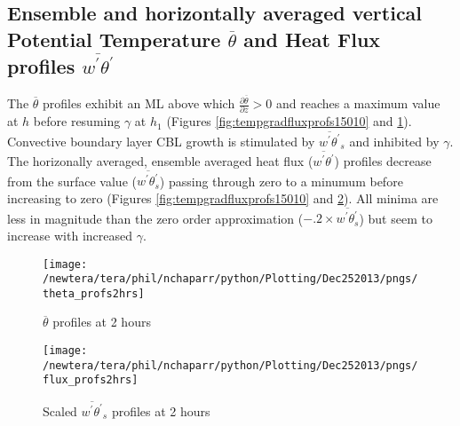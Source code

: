 \clearpage

\subsection{Ensemble and horizontally averaged vertical Potential Temperature $\overline{\theta}$ 
and Heat Flux profiles $\overline{w^{'}\theta^{'}}$}
\FloatBarrier

\clearpage

The $\overline{\theta}$ profiles exhibit an \acs{ML} above which  $\frac{\partial\overline{\theta}}{\partial z}>0$ 
and reaches a maximum value at $h$ before resuming $\gamma$  at $h_{1}$ 
(Figures \ref{fig:tempgradfluxprofs15010} and \ref{fig:pottempprofs2hrs}).  Convective boundary layer \acs{CBL} growth is stimulated 
by $\overline{w^{'}\theta^{'}}_{s}$ and inhibited by $\gamma$.\\

The horizonally averaged, ensemble averaged heat flux ($\overline{w^{'}\theta^{'}}$) profiles decrease 
from the surface value ($\overline{w^{'}\theta^{'}_{s}}$) passing through zero to a minumum before 
increasing to zero (Figures \ref{fig:tempgradfluxprofs15010} and  \ref{fig:fluxprofs2hrs}).  All minima are 
less  in magnitude than the zero order approximation ($-.2 \times \overline{w^{'}\theta^{'}_{s}}$) but seem to increase
with increased $\gamma$.\\


\begin{figure}[htbp]
    \centering
    \texttt{[image: /newtera/tera/phil/nchaparr/python/Plotting/Dec252013/pngs/theta\_profs2hrs]}
    \caption{$\overline{\theta}$ profiles at 2 hours}
    \label{fig:pottempprofs2hrs}   %
\end{figure}

\begin{figure}[htbp]
    \centering
    \texttt{[image: /newtera/tera/phil/nchaparr/python/Plotting/Dec252013/pngs/flux\_profs2hrs]}
    \caption{Scaled $\overline{w^{'}\theta^{'}}_{s}$ profiles at 2 hours}
    \label{fig:fluxprofs2hrs}   %
\end{figure}


